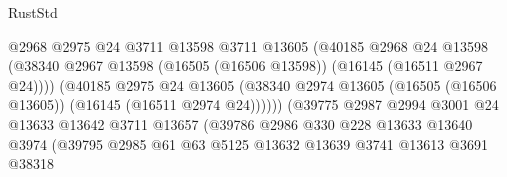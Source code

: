 \begin{lexlean}{RustStd}
\begin{coremodule}
                                          @2968
                                          @2975
                                          @24
                                          @3711
                                          @13598
                                          @3711
                                          @13605
                                          (@40185
                                            @2968
                                            @24
                                            @13598
                                            (@38340
                                              @2967
                                              @13598
                                              (@16505 (@16506 @13598))
                                              (@16145 (@16511 @2967 @24))))
                                          (@40185
                                            @2975
                                            @24
                                            @13605
                                            (@38340
                                              @2974
                                              @13605
                                              (@16505 (@16506 @13605))
                                              (@16145 (@16511 @2974 @24))))))
                                      (@39775
                                        @2987
                                        @2994
                                        @3001
                                        @24
                                        @13633
                                        @13642
                                        @3711
                                        @13657
                                        (@39786
                                          @2986
                                          @330
                                          @228
                                          @13633
                                          @13640
                                          @3974
                                          (@39795
                                            @2985
                                            @61
                                            @63
                                            @5125
                                            @13632
                                            @13639
                                            @3741
                                            @13613
                                            @3691
                                            @38318

\end{coremodule}
\end{lexlean}
